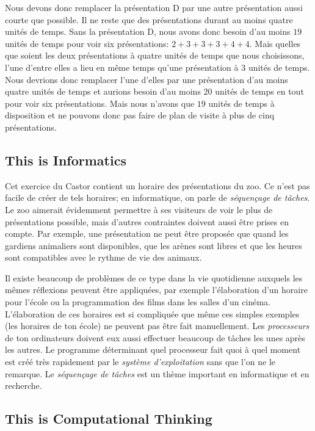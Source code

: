\documentclass[a4paper,11pt]{report}
\begin{document}
Nous devons donc remplacer la présentation D par une autre présentation aussi courte que possible. Il ne reste que des présentations durant au moins quatre unités de temps. Sans la présentation D, nous avons donc besoin d’au moins $19$ unités de temps pour voir six présentations: ${2 + 3 + 3 + 3 + 4 + 4}$. Mais quelles que soient les deux présentations à quatre unités de temps que nous choisissons, l’une d’entre elles a lieu en même temps qu’une présentation à $3$ unités de temps. Nous devrions donc remplacer l’une d’elles par une présentation d’au moins quatre unités de temps et aurions besoin d’au moins $20$ unités de temps en tout pour voir six présentations. Mais nous n’avons que $19$ unités de temps à disposition et ne pouvons donc pas faire de plan de visite à plus de cinq présentations.


\subsection*{This is Informatics}

Cet exercice du Castor contient un horaire des présentations du zoo. Ce n’est pas facile de créer de tels horaires; en informatique, on parle de \emph{séquençage de tâches}. Le zoo aimerait évidemment permettre à ses visiteurs de voir le plus de présentations possible, mais d’autres contraintes doivent aussi être prises en compte. Par exemple, une présentation ne peut être proposée que quand les gardiens animaliers sont disponibles, que les arènes sont libres et que les heures sont compatibles avec le rythme de vie des animaux.

Il existe beaucoup de problèmes de ce type dans la vie quotidienne auxquels les mêmes réflexions peuvent être appliquées, par exemple l’élaboration d’un horaire pour l’école ou la programmation des films dans les salles d’un cinéma. L’élaboration de ces horaires est si compliquée que même ces simples exemples (les horaires de ton école) ne peuvent pas être fait manuellement. Les \emph{processeurs} de ton ordinateurs doivent eux aussi effectuer beaucoup de tâches les unes après les autres. Le programme déterminant quel processeur fait quoi à quel moment est créé très rapidement par le \emph{système d’exploitation} sans que l’on ne le remarque. Le \emph{séquençage de tâches} est un thème important en informatique et en recherche.


\subsection*{This is Computational Thinking}
\end{document}
